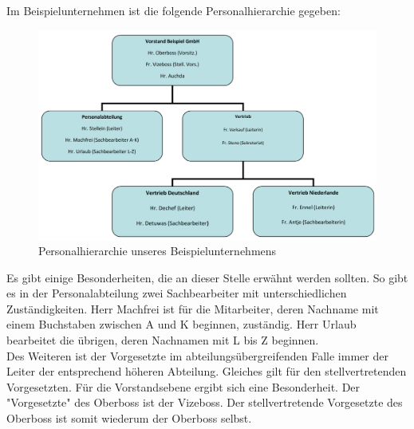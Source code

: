 Im Beispielunternehmen ist die folgende Personalhierarchie gegeben:
\begin{figure}[H]
\centering
\includegraphics[width=1.0\linewidth]{Bilder/Hierarchie}
\caption[]{Personalhierarchie unseres Beispielunternehmens\footnotemark}
\label{fig:Hierarchie}
\end{figure}

Es gibt einige Besonderheiten, die an dieser Stelle erwähnt werden sollten. So gibt es in der Personalabteilung zwei Sachbearbeiter mit unterschiedlichen Zuständigkeiten. Herr Machfrei ist für die Mitarbeiter, deren Nachname mit einem Buchstaben zwischen A und K beginnen, zuständig. Herr Urlaub bearbeitet die übrigen, deren Nachnamen mit L bis Z beginnen.\\
Des Weiteren ist der Vorgesetzte im abteilungsübergreifenden Falle immer der Leiter der entsprechend höheren Abteilung. Gleiches gilt für den stellvertretenden Vorgesetzten. Für die Vorstandsebene ergibt sich eine Besonderheit. Der "Vorgesetzte" des Oberboss ist der Vizeboss. Der stellvertretende Vorgesetzte des Oberboss ist somit wiederum der Oberboss selbst.


